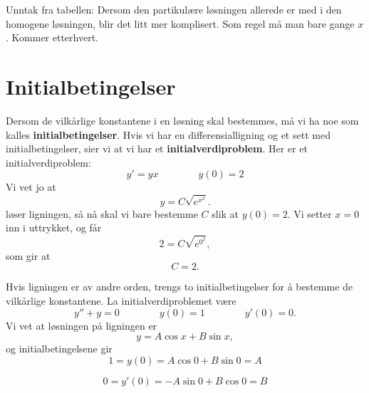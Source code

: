 Unntak fra tabellen: Dersom den partikul{\ae}re l{\o}sningen allerede er med i den homogene l{\o}sningen, blir det litt mer komplisert. Som regel m{\aa} man bare gange $x$. Kommer
etterhvert.

\section*{Initialbetingelser}
Dersom de vilk{\aa}rlige konstantene i en l{\o}sning skal bestemmes, m{\aa} vi ha noe som kalles \textbf{initialbetingelser}. Hvis vi har en differensialligning og et sett med
initialbetingelser, sier vi at vi har et \textbf{initialverdiproblem}.
Her er et initialverdiproblem:
\begin{equation*}
y'=yx \qquad \qquad y(0)=2
\end{equation*}
Vi vet jo at 
\begin{equation*}
y=C\sqrt{e^{x^{2}}}.
\end{equation*}
l{\o}ser ligningen, s{\aa} n{\aa} skal vi bare bestemme $C$ slik at $y(0)=2$. Vi setter $x=0$ inn i uttrykket, og f{\aa}r 
\begin{equation*}
2=C\sqrt{e^{0^{2}}}, 
\end{equation*}
som gir at 
\begin{equation*}
C=2.
\end{equation*}

Hvis ligningen er av andre orden, trengs to initialbetingelser for {\aa} bestemme de vilk{\aa}rlige konstantene. La initialverdiproblemet v{\ae}re
\begin{equation*}
y''+y=0 \qquad \qquad y(0)=1 \qquad \qquad y'(0)=0.
\end{equation*}
Vi vet at l{\o}sningen p{\aa} ligningen er
\begin{equation*}
y=A\cos{x}+B\sin{x}, 
\end{equation*}
og initialbetingelsene gir
\begin{equation*}
1=y(0)=A\cos{0}+B\sin{0}=A
\end{equation*}

\begin{equation*}
0=y'(0)=-A\sin{0}+B\cos{0}=B
\end{equation*}


\kapittelslutt
